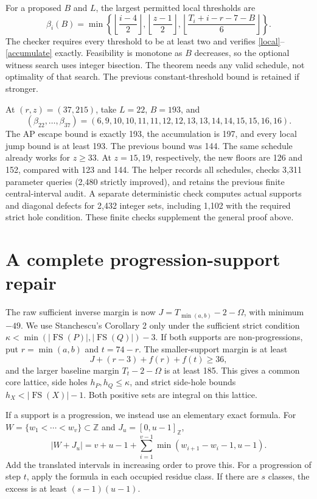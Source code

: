 \documentclass[11pt,a4paper]{article}
\newcommand{\FS}{\operatorname{FS}}
\newcommand{\Z}{\mathbb Z}
\begin{document}
For a proposed $B$ and $L$, the largest permitted local thresholds are
\begin{equation}\label{search}
 \beta_i(B)=\min\left\{
 \left\lfloor\frac{i-4}{2}\right\rfloor,
 \left\lfloor\frac{z-1}{2}\right\rfloor,
 \left\lfloor\frac{T_i+i-r-7-B}{6}\right\rfloor\right\}.
\end{equation}
The checker requires every threshold to be at least two and verifies
\eqref{local}--\eqref{accumulate} exactly. Feasibility is monotone
as $B$ decreases, so the optional witness search uses integer bisection.
The theorem needs any valid schedule, not optimality of that search.
The previous constant-threshold bound is retained if stronger.

At $(r,z)=(37,215)$, take $L=22$, $B=193$, and
\[
 (\beta_{22},\ldots,\beta_{37})=
 (6,9,10,10,11,11,12,12,13,13,14,14,15,15,16,16).
\]
The AP escape bound is exactly 193, the accumulation is 197, and
every local jump bound is at least 193. The previous bound was 144. The same schedule already works for $z\ge33$.
At $z=15,19$, respectively, the new floors are 126 and 152,
compared with 123 and 144. The helper
 records all schedules,
checks 3,311 parameter queries (2,480 strictly improved), and retains
the previous finite central-interval audit. A separate deterministic
check computes actual supports and diagonal defects for 2,432 integer
sets, including 1,102 with the required strict hole condition. These finite checks supplement the general proof above.

\section{A complete progression-support repair}
The raw sufficient inverse margin is now
$J=T_{\min(a,b)}-2-\Omega$, with minimum $-49$.
We use Stanchescu's Corollary 2 \cite{stanchescu} only under the
sufficient strict condition
$\kappa<\min(|\FS(P)|,|\FS(Q)|)-3$.
If both supports are non-progressions, put $r=\min(a,b)$ and $t=74-r$.
The smaller-support margin is at least
\[
 J+(r-3)+f(r)+f(t)\ge36,
\]
and the larger baseline margin $T_t-2-\Omega$ is at least 185.
This gives a common core lattice, side holes $h_P,h_Q\le\kappa$,
and strict side-hole bounds $h_X<|\FS(X)|-1$.
Both positive sets are integral on this lattice.

If a support is a progression, we instead use an elementary exact formula.
For $W=\{w_1<\cdots<w_v\}\subset\Z$ and $J_u=[0,u-1]_{\Z}$,
\begin{equation}\label{gap}
 |W+J_u|=v+u-1+
 \sum_{i=1}^{v-1}\min(w_{i+1}-w_i-1,u-1).
\end{equation}
Add the translated intervals in increasing order to prove this.
For a progression of step $t$, apply the formula in each occupied
residue class. If there are $s$ classes, the excess is at least
$(s-1)(u-1)$.
\end{document}

